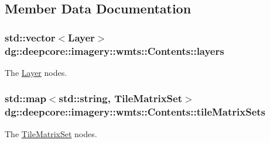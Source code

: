 \subsection{Member Data Documentation}
\subsubsection[{\texorpdfstring{layers}{layers}}]{\setlength{\rightskip}{0pt plus 5cm}std\+::vector$<${\bf Layer}$>$ dg\+::deepcore\+::imagery\+::wmts\+::\+Contents\+::layers}\hypertarget{structdg_1_1deepcore_1_1imagery_1_1wmts_1_1_contents_ac634257db9b4a3bcfd653425212d7eb2}{}\label{structdg_1_1deepcore_1_1imagery_1_1wmts_1_1_contents_ac634257db9b4a3bcfd653425212d7eb2}


The \hyperlink{structdg_1_1deepcore_1_1imagery_1_1wmts_1_1_layer}{Layer} nodes. 

\subsubsection[{\texorpdfstring{tile\+Matrix\+Sets}{tileMatrixSets}}]{\setlength{\rightskip}{0pt plus 5cm}std\+::map$<$std\+::string, {\bf Tile\+Matrix\+Set}$>$ dg\+::deepcore\+::imagery\+::wmts\+::\+Contents\+::tile\+Matrix\+Sets}\hypertarget{structdg_1_1deepcore_1_1imagery_1_1wmts_1_1_contents_afa21421460450c381d86310758710a51}{}\label{structdg_1_1deepcore_1_1imagery_1_1wmts_1_1_contents_afa21421460450c381d86310758710a51}


The \hyperlink{structdg_1_1deepcore_1_1imagery_1_1wmts_1_1_tile_matrix_set}{Tile\+Matrix\+Set} nodes. 

